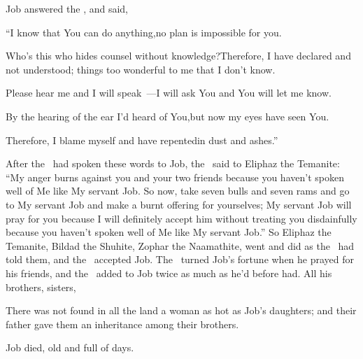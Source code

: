 
\begin{inparaenum}
   Job answered the \lord, and said,\smallskip%
  
  \pb {} ``I know that You can do anything,\pa no plan is impossible for you.%
  
  \pb {} Who's this who hides counsel without knowledge?\pa Therefore, I have declared and not understood; things too wonderful to me that I don't know.%
  
  \pb {} Please hear me and I will speak~---\pa I will ask You and You will let me know.%
  
  \pb {} By the hearing of the ear I'd heard of You,\pa but now my eyes have seen You.%
  
  \pb {} Therefore, I blame myself and have repented\pa in dust and ashes.''\smallskip%
  
   After the \lord\ had spoken these words to Job, the \lord\ said to Eliphaz the Temanite: ``My anger burns against you and your two friends because you haven't spoken well of Me like My servant Job.%
   So now, take seven bulls and seven rams and go to My servant Job and make a burnt offering for yourselves; My servant Job will pray for you because I will definitely accept him without treating you disdainfully because you haven't spoken well of Me like My servant Job.''%
   So Eliphaz the Temanite, Bildad the Shuhite, Zophar the Naamathite, went and did as the \lord\ had told them, and the \lord\ accepted Job.%
   The \lord\ turned Job's fortune when he prayed for his friends, and the \lord\ added to Job twice as much as he'd before had.%
   All his brothers, sisters, %
  
   There was not found in all the land a woman as hot as Job's daughters; and their father gave them an inheritance among their brothers.%
  
   Job died, old and full of days.%
\end{inparaenum}
